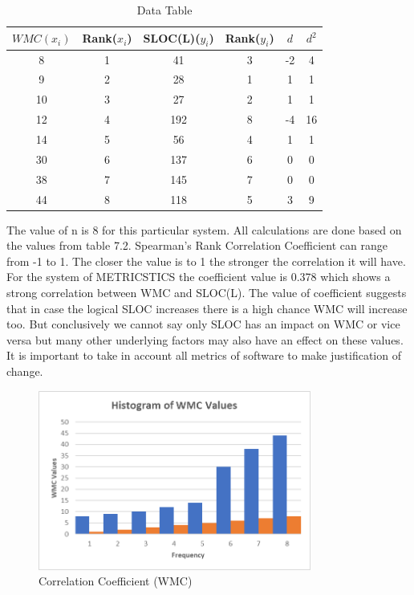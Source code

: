 \documentclass[english,12pt,a4paper]{report}
\begin{document}
	\begin{table}[htbp]
		\centering
		
		\begin{tabular}{|c|c|c|c|c|c|}
			\hline
			$WMC(x_i)$ & Rank($x_i$) & SLOC(L)($y_i$) & Rank($y_i$) & $d$ & $d^2$ \\
			\hline
			8 &	1	&41 &	3 &	-2	&4 \\
			9	&2	&28 &	1 &	1 &	1 \\
			10 & 3 & 27 &	2 &	1 &	1 \\
			12 & 4 &	192 &	8 &	-4 &	16 \\
			14 &	5	& 56	& 4 &	1 &	1\\
			30 &	6 &	137 &	6 &	0 &	0\\
			38 &	7 &	145 &	7	& 0 &	0 \\
			44 &	8	& 118 &	5 &	3 &	9\\
			
			
			
			\hline
		\end{tabular}
		\caption{Data Table}
	\end{table}
	The value of n is 8 for this particular system. All calculations are done based on the values from table 7.2. Spearman’s Rank Correlation Coefficient can range from -1 to 1. The closer the value is to 1 the stronger the correlation it will have. For the system of METRICSTICS the coefficient value is 0.378 which shows a strong correlation between WMC and SLOC(L). The value of coefficient suggests that in case the logical SLOC increases there is a high chance WMC will increase too. But conclusively we cannot say only SLOC has an impact on WMC or vice versa but many other underlying factors may also have an effect on these values. It is important to take in account all metrics of software to make justification of change.
	
	
	\begin{figure}[H]
		\centering
		\includegraphics[width=0.8\textwidth]{images/HistoWMC.png}
		\caption{Correlation Coefficient (WMC)}
		\label{fig:Correlation Coefficient (WMC)}
	\end{figure}
	
\end{document}
